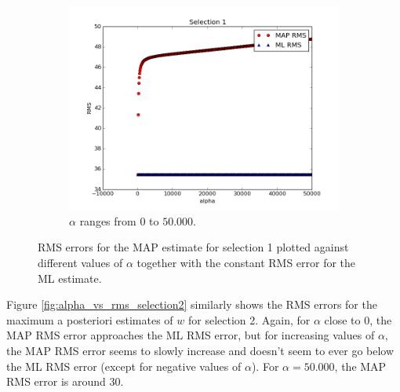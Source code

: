 \documentclass[a4paper]{article}
\begin{document}
\begin{figure}[H]
\begin{adjustwidth}{-7em}{-7em}
    \begin{subfigure}{.32\linewidth}
      \includegraphics[width=\linewidth]{figures/alpha_vs_rms_selection1c.png}
      \caption{$\alpha$ ranges from $0$ to $50.000$.}
      \label{fig:alpha_vs_rms_selection1c}
    \end{subfigure}
  \end{adjustwidth}
  \caption{RMS errors for the MAP estimate for selection 1 plotted against different values of $\alpha$ together with the constant RMS error for the ML estimate.}
  \label{fig:alpha_vs_rms_selection1}
\end{figure}

Figure \ref{fig:alpha_vs_rms_selection2} similarly shows the RMS errors for the maximum a posteriori estimates of $w$ for selection 2. Again, for $\alpha$ close to $0$, the MAP RMS error approaches the ML RMS error, but for increasing values of $\alpha$, the MAP RMS error seems to slowly increase and doesn't seem to ever go below the ML RMS error (except for negative values of $\alpha$). For $\alpha = 50.000$, the MAP RMS error is around $30$.
\end{document}
